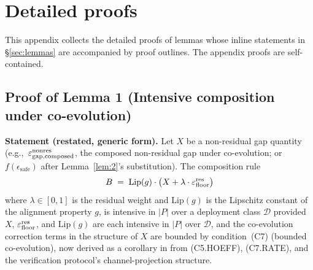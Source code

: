 \section{Detailed proofs}
\label{app:proofs}

This appendix collects the detailed proofs of lemmas whose
inline statements in \S\ref{sec:lemmas} are accompanied by
proof outlines.  The appendix proofs are self-contained.

\subsection{Proof of Lemma 1 (Intensive composition under co-evolution)}
\label{app:proof_lem1}

\textbf{Statement (restated, generic form).}  Let $X$ be a non-residual
gap quantity (e.g.,\ $\varepsilon_{\mathrm{gap},\mathrm{composed}}^{\mathrm{nonres}}$, the composed
non-residual gap under co-evolution; or $f(\epsilon_{\mathrm{safe}})$
after Lemma~\ref{lem:2}'s substitution).  The composition rule
\[
  B \;=\; \mathrm{Lip}(g) \cdot \bigl(X + \lambda \cdot \varepsilon_{\mathrm{floor}}^{\mathrm{res}}\bigr)
\]
where $\lambda \in [0, 1]$ is the residual weight and
$\mathrm{Lip}(g)$ is the Lipschitz constant of the alignment
property $g$, is intensive in $|P|$ over a deployment class
$\mathcal{D}$ provided $X$, $\varepsilon_{\mathrm{floor}}^{\mathrm{res}}$, and $\mathrm{Lip}(g)$ are
each intensive in $|P|$ over $\mathcal{D}$, and the co-evolution
correction terms in the structure of $X$ are bounded by
condition~(C7) (bounded co-evolution), now derived as a corollary
in \citep[Theorem~1]{lasser2026foundations} from (C5.HOEFF),
(C7.RATE), and the verification protocol's channel-projection
structure.

